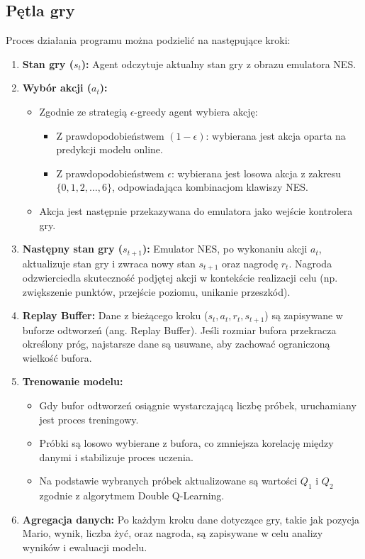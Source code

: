 \subsection{Pętla gry}
Proces działania programu można podzielić na następujące kroki:
\begin{enumerate}
	\item \textbf{Stan gry (\(s_t\)):} Agent odczytuje aktualny stan gry z obrazu emulatora NES.

	\item \textbf{Wybór akcji (\(a_t\)):}
	      \begin{itemize}
		      \item Zgodnie ze strategią \(\epsilon\)-greedy agent wybiera akcję:
		            \begin{itemize}
			            \item Z prawdopodobieństwem \((1 - \epsilon)\): wybierana jest akcja oparta na predykcji modelu online.
			            \item Z prawdopodobieństwem \(\epsilon\): wybierana jest losowa akcja z zakresu \( \{0, 1, 2, \dots, 6\} \), odpowiadająca kombinacjom klawiszy NES.
		            \end{itemize}
		      \item Akcja jest następnie przekazywana do emulatora jako wejście kontrolera gry.
	      \end{itemize}

	\item \textbf{Następny stan gry (\(s_{t+1}\)):} Emulator NES, po wykonaniu akcji \(a_t\), aktualizuje stan gry i zwraca nowy stan \(s_{t+1}\) oraz nagrodę \(r_t\). Nagroda odzwierciedla skuteczność podjętej akcji w kontekście realizacji celu (np. zwiększenie punktów, przejście poziomu, unikanie przeszkód).

	\item \textbf{Replay Buffer:} Dane z bieżącego kroku (\(s_t, a_t, r_t, s_{t+1}\)) są zapisywane w buforze odtworzeń (ang. Replay Buffer). Jeśli rozmiar bufora przekracza określony próg, najstarsze dane są usuwane, aby zachować ograniczoną wielkość bufora.

	\item \textbf{Trenowanie modelu:}
	      \begin{itemize}
		      \item Gdy bufor odtworzeń osiągnie wystarczającą liczbę próbek, uruchamiany jest proces treningowy.
		      \item Próbki są losowo wybierane z bufora, co zmniejsza korelację między danymi i stabilizuje proces uczenia.
		      \item Na podstawie wybranych próbek aktualizowane są wartości \(Q_1\) i \(Q_2\) zgodnie z algorytmem Double Q-Learning.
	      \end{itemize}

	\item \textbf{Agregacja danych:} Po każdym kroku dane dotyczące gry, takie jak pozycja Mario, wynik, liczba żyć, oraz nagroda, są zapisywane w celu analizy wyników i ewaluacji modelu.
\end{enumerate}

